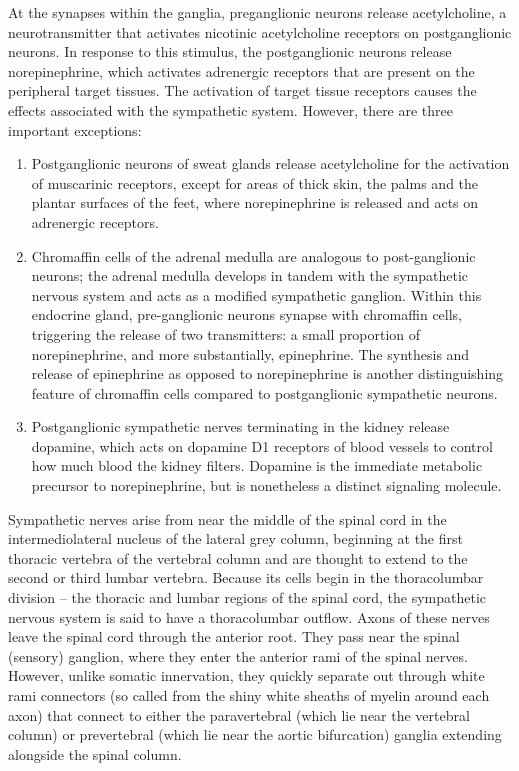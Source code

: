 At the synapses within the ganglia, preganglionic neurons release acetylcholine, a neurotransmitter that activates nicotinic acetylcholine receptors on postganglionic neurons. In response to this stimulus, the postganglionic neurons release norepinephrine, which activates adrenergic receptors that are present on the peripheral target tissues. The activation of target tissue receptors causes the effects associated with the sympathetic system. However, there are three important exceptions:

\begin{enumerate}
\def\labelenumi{\arabic{enumi}.}
\tightlist
\item
  Postganglionic neurons of sweat glands release acetylcholine for the activation of muscarinic receptors, except for areas of thick skin, the palms and the plantar surfaces of the feet, where norepinephrine is released and acts on adrenergic receptors.
\item
  Chromaffin cells of the adrenal medulla are analogous to post-ganglionic neurons; the adrenal medulla develops in tandem with the sympathetic nervous system and acts as a modified sympathetic ganglion. Within this endocrine gland, pre-ganglionic neurons synapse with chromaffin cells, triggering the release of two transmitters: a small proportion of norepinephrine, and more substantially, epinephrine. The synthesis and release of epinephrine as opposed to norepinephrine is another distinguishing feature of chromaffin cells compared to postganglionic sympathetic neurons.
\item
  Postganglionic sympathetic nerves terminating in the kidney release dopamine, which acts on dopamine D1 receptors of blood vessels to control how much blood the kidney filters. Dopamine is the immediate metabolic precursor to norepinephrine, but is nonetheless a distinct signaling molecule.
\end{enumerate}

Sympathetic nerves arise from near the middle of the spinal cord in the intermediolateral nucleus of the lateral grey column, beginning at the first thoracic vertebra of the vertebral column and are thought to extend to the second or third lumbar vertebra. Because its cells begin in the thoracolumbar division -- the thoracic and lumbar regions of the spinal cord, the sympathetic nervous system is said to have a thoracolumbar outflow. Axons of these nerves leave the spinal cord through the anterior root. They pass near the spinal (sensory) ganglion, where they enter the anterior rami of the spinal nerves. However, unlike somatic innervation, they quickly separate out through white rami connectors (so called from the shiny white sheaths of myelin around each axon) that connect to either the paravertebral (which lie near the vertebral column) or prevertebral (which lie near the aortic bifurcation) ganglia extending alongside the spinal column.


